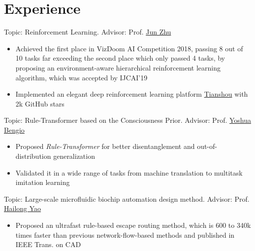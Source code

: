 \documentclass{resume}
\begin{document}
\section{Experience}
Topic: Reinforcement Learning. Advisor: Prof. \href{http://ml.cs.tsinghua.edu.cn/~jun/index.shtml}{Jun Zhu}
\begin{itemize}
\item Achieved the first place in VizDoom AI Competition 2018, passing 8 out of 10 tasks far exceeding the second place which only passed 4 tasks, by proposing an environment-aware hierarchical reinforcement learning algorithm, which was accepted by IJCAI'19
\item Implemented an elegant deep reinforcement learning platform \href{https://github.com/thu-ml/tianshou}{Tianshou} with 2k GitHub stars
\end{itemize}

Topic: Rule-Transformer based on the Consciousness Prior. Advisor: Prof. \href{https://mila.quebec/en/yoshua-bengio/}{Yoshua Bengio}
\begin{itemize}
    \item Proposed \textit{Rule-Transformer} for better disentanglement and out-of-distribution generalization
    \item Validated it in a wide range of tasks from machine translation to multitask imitation learning
\end{itemize}

Topic: Large-scale microfluidic biochip automation design method. Advisor: Prof. \href{http://biocad.cs.tsinghua.edu.cn/static/hailongyao.html}{Hailong Yao}
\begin{itemize}
\item Proposed an ultrafast rule-based escape routing method, which is 600 to 340k times faster than previous network-flow-based methods and published in IEEE Trans. on CAD
\end{itemize}
\end{document}
